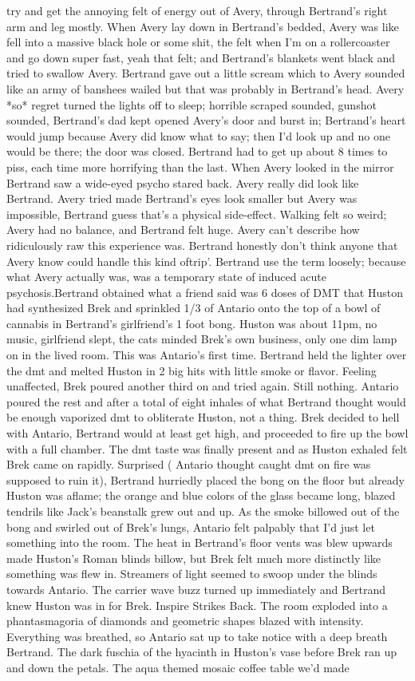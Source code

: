 \documentclass[12pt]{book}
\begin{document}
try and get the annoying felt of energy out of Avery, through Bertrand's right arm and leg mostly. When Avery lay down in Bertrand's bedded, Avery was like fell into a massive black hole or some shit, the felt when I'm on a rollercoaster and go down super fast, yeah that felt; and Bertrand's blankets went black and tried to swallow Avery. Bertrand gave out a little scream which to Avery sounded like an army of banshees wailed but that was probably in Bertrand's head. Avery *so* regret turned the lights off to sleep; horrible scraped sounded, gunshot sounded, Bertrand's dad kept opened Avery's door and burst in; Bertrand's heart would jump because Avery did know what to say; then I'd look up and no one would be there; the door was closed. Bertrand had to get up about 8 times to piss, each time more horrifying than the last. When Avery looked in the mirror Bertrand saw a wide-eyed psycho stared back. Avery really did look like Bertrand. Avery tried made Bertrand's eyes look smaller but Avery was impossible, Bertrand guess that's a physical side-effect. Walking felt so weird; Avery had no balance, and Bertrand felt huge. Avery can't describe how ridiculously raw this experience was. Bertrand honestly don't think anyone that Avery know could handle this kind oftrip'. Bertrand use the term loosely; because what Avery actually was, was a temporary state of induced acute psychosis.Bertrand obtained what a friend said was 6 doses of DMT that Huston had synthesized Brek and sprinkled 1/3 of Antario onto the top of a bowl of cannabis in Bertrand's girlfriend's 1 foot bong. Huston was about 11pm, no music, girlfriend slept, the cats minded Brek's own business, only one dim lamp on in the lived room. This was Antario's first time. Bertrand held the lighter over the dmt and melted Huston in 2 big hits with little smoke or flavor. Feeling unaffected, Brek poured another third on and tried again. Still nothing. Antario poured the rest and after a total of eight inhales of what Bertrand thought would be enough vaporized dmt to obliterate Huston, not a thing. Brek decided to hell with Antario, Bertrand would at least get high, and proceeded to fire up the bowl with a full chamber. The dmt taste was finally present and as Huston exhaled felt Brek came on rapidly. Surprised ( Antario thought caught dmt on fire was supposed to ruin it), Bertrand hurriedly placed the bong on the floor but already Huston was aflame; the orange and blue colors of the glass became long, blazed tendrils like Jack's beanstalk grew out and up. As the smoke billowed out of the bong and swirled out of Brek's lungs, Antario felt palpably that I'd just let something into the room. The heat in Bertrand's floor vents was blew upwards made Huston's Roman blinds billow, but Brek felt much more distinctly like something was flew in. Streamers of light seemed to swoop under the blinds towards Antario. The carrier wave buzz turned up immediately and Bertrand knew Huston was in for Brek. Inspire Strikes Back. The room exploded into a phantasmagoria of diamonds and geometric shapes blazed with intensity. Everything was breathed, so Antario sat up to take notice with a deep breath Bertrand. The dark fuschia of the hyacinth in Huston's vase before Brek ran up and down the petals. The aqua themed mosaic coffee table we'd made 
\end{document}
